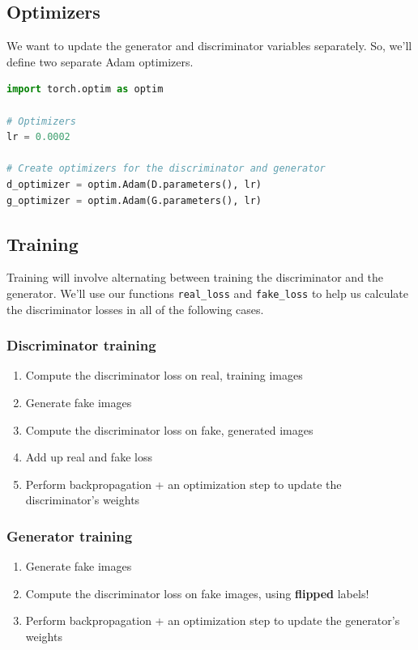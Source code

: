 \subsection{Optimizers}

We want to update the generator and discriminator variables separately.
So, we'll define two separate Adam optimizers.

\begin{lstlisting}[language=Python]
import torch.optim as optim

# Optimizers
lr = 0.0002

# Create optimizers for the discriminator and generator
d_optimizer = optim.Adam(D.parameters(), lr)
g_optimizer = optim.Adam(G.parameters(), lr)
\end{lstlisting}

\subsection{Training}

Training will involve alternating between training the discriminator and
the generator. We'll use our functions
\lstinline{real_loss} and
\lstinline{fake_loss} to help us calculate the
discriminator losses in all of the following cases.

\subsubsection{Discriminator training}

\begin{enumerate}
\item Compute the discriminator loss on real, training images
\item Generate fake images
\item Compute the discriminator loss on fake, generated images
\item Add up real and fake loss
\item Perform backpropagation + an optimization step to update the discriminator's weights
\end{enumerate}

\subsubsection{Generator training}

\begin{enumerate}
\item Generate fake images
\item Compute the discriminator loss on fake images, using \textbf{flipped} labels!
\item Perform backpropagation + an optimization step to update the generator's weights
\end{enumerate}

